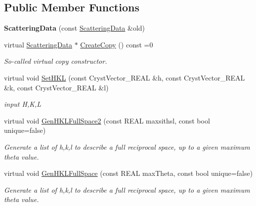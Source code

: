 \subsection*{Public Member Functions}
\begin{DoxyCompactItemize}
\item 
\mbox{\label{class_obj_cryst_1_1_scattering_data_a903a77bd764277db294220be8c560fbf}} 
{\bfseries Scattering\+Data} (const \mbox{\hyperlink{class_obj_cryst_1_1_scattering_data}{Scattering\+Data}} \&old)
\item 
\mbox{\label{class_obj_cryst_1_1_scattering_data_a9356e72bc7a48184692100d0d1ee8ea1}} 
virtual \mbox{\hyperlink{class_obj_cryst_1_1_scattering_data}{Scattering\+Data}} $\ast$ \mbox{\hyperlink{class_obj_cryst_1_1_scattering_data_a9356e72bc7a48184692100d0d1ee8ea1}{Create\+Copy}} () const =0
\begin{DoxyCompactList}\small\item\em So-\/called virtual copy constructor. \end{DoxyCompactList}\item 
virtual void \mbox{\hyperlink{class_obj_cryst_1_1_scattering_data_a0520a10b24b0e4f05ba5cee4f3e29c92}{Set\+H\+KL}} (const Cryst\+Vector\+\_\+\+R\+E\+AL \&h, const Cryst\+Vector\+\_\+\+R\+E\+AL \&k, const Cryst\+Vector\+\_\+\+R\+E\+AL \&l)
\begin{DoxyCompactList}\small\item\em input H,K,L \end{DoxyCompactList}\item 
virtual void \mbox{\hyperlink{class_obj_cryst_1_1_scattering_data_a63f682dfda2e03f2ab00826c5e116033}{Gen\+H\+K\+L\+Full\+Space2}} (const R\+E\+AL maxsithsl, const bool unique=false)
\begin{DoxyCompactList}\small\item\em Generate a list of h,k,l to describe a full reciprocal space, up to a given maximum theta value. \end{DoxyCompactList}\item 
virtual void \mbox{\hyperlink{class_obj_cryst_1_1_scattering_data_a3d15ed5e447e6b2ff6fd8fdaad43a37d}{Gen\+H\+K\+L\+Full\+Space}} (const R\+E\+AL max\+Theta, const bool unique=false)
\begin{DoxyCompactList}\small\item\em Generate a list of h,k,l to describe a full reciprocal space, up to a given maximum theta value. \end{DoxyCompactList}\item 

\end{DoxyCompactItemize}
